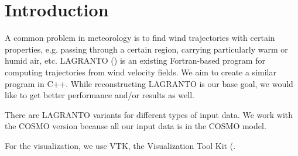 \setcounter{chapter}{0}

\chapter{Introduction}

A common problem in meteorology is to find wind trajectories with certain properties, e.g. passing through a certain region, carrying particularly warm or humid air, etc.
LAGRANTO (\cite{src:lagranto}) is an existing Fortran-based program for computing trajectories from wind velocity fields.
We aim to create a similar program in C++. While reconstructing LAGRANTO is our base goal, we would like to get better performance and/or results as well.

There are LAGRANTO variants for different types of input data. We work with the COSMO version because all our input data is in the COSMO model.

For the visualization, we use VTK, the Visualization Tool Kit (\cite{src:vtk}.
%

